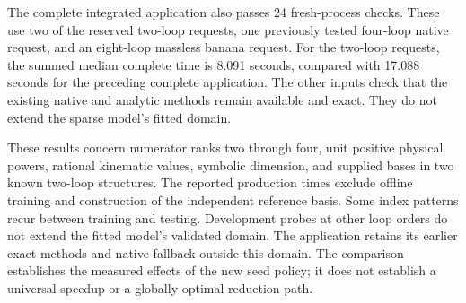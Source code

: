 The complete integrated application also passes 24 fresh-process checks. These use two of the reserved two-loop requests, one previously tested four-loop native request, and an eight-loop massless banana request. For the two-loop requests, the summed median complete time is 8.091 seconds, compared with 17.088 seconds for the preceding complete application. The other inputs check that the existing native and analytic methods remain available and exact. They do not extend the sparse model's fitted domain.

These results concern numerator ranks two through four, unit positive physical powers, rational kinematic values, symbolic dimension, and supplied bases in two known two-loop structures. The reported production times exclude offline training and construction of the independent reference basis. Some index patterns recur between training and testing. Development probes at other loop orders do not extend the fitted model's validated domain. The application retains its earlier exact methods and native fallback outside this domain. The comparison establishes the measured effects of the new seed policy; it does not establish a universal speedup or a globally optimal reduction path.
